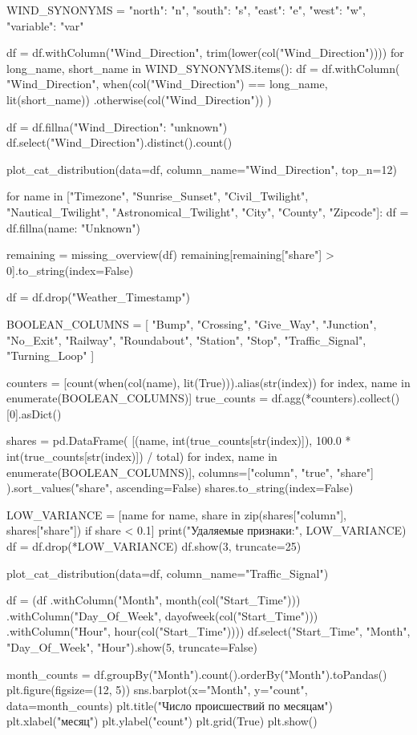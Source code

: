 \begin{code}
WIND_SYNONYMS = {"north": "n", "south": "s", "east": "e", "west": "w",
                  "variable": "var"}

df = df.withColumn("Wind_Direction", trim(lower(col("Wind_Direction"))))
for long_name, short_name in WIND_SYNONYMS.items():
    df = df.withColumn(
        "Wind_Direction",
        when(col("Wind_Direction") == long_name, lit(short_name))
        .otherwise(col("Wind_Direction"))
    )

df = df.fillna({"Wind_Direction": "unknown"})
df.select("Wind_Direction").distinct().count()

plot_cat_distribution(data=df, column_name="Wind_Direction", top_n=12)

for name in ["Timezone", "Sunrise_Sunset", "Civil_Twilight", "Nautical_Twilight",
              "Astronomical_Twilight", "City", "County", "Zipcode"]:
    df = df.fillna({name: "Unknown"})

remaining = missing_overview(df)
remaining[remaining["share"] > 0].to_string(index=False)

df = df.drop("Weather_Timestamp")

BOOLEAN_COLUMNS = [
    "Bump", "Crossing", "Give_Way", "Junction", "No_Exit", "Railway", "Roundabout",
    "Station", "Stop", "Traffic_Signal", "Turning_Loop"
]

counters = [count(when(col(name), lit(True))).alias(str(index))
            for index, name in enumerate(BOOLEAN_COLUMNS)]
true_counts = df.agg(*counters).collect()[0].asDict()

shares = pd.DataFrame(
    [(name, int(true_counts[str(index)]), 100.0 * int(true_counts[str(index)]) / total)
     for index, name in enumerate(BOOLEAN_COLUMNS)],
    columns=["column", "true", "share"]
).sort_values("share", ascending=False)
shares.to_string(index=False)

LOW_VARIANCE = [name for name, share in zip(shares["column"], shares["share"]) if share < 0.1]
print("Удаляемые признаки:", LOW_VARIANCE)
df = df.drop(*LOW_VARIANCE)
df.show(3, truncate=25)

plot_cat_distribution(data=df, column_name="Traffic_Signal")

df = (df
      .withColumn("Month", month(col("Start_Time")))
      .withColumn("Day_Of_Week", dayofweek(col("Start_Time")))
      .withColumn("Hour", hour(col("Start_Time"))))
df.select("Start_Time", "Month", "Day_Of_Week", "Hour").show(5, truncate=False)

month_counts = df.groupBy("Month").count().orderBy("Month").toPandas()
plt.figure(figsize=(12, 5))
sns.barplot(x="Month", y="count", data=month_counts)
plt.title("Число происшествий по месяцам")
plt.xlabel("месяц")
plt.ylabel("count")
plt.grid(True)
plt.show()


\end{code}
